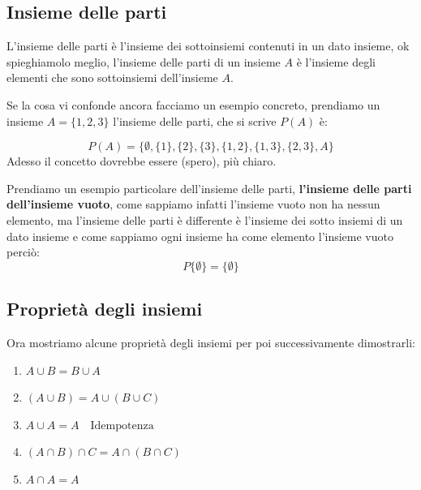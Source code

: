 \documentclass{article}
\begin{document}
\subsection{Insieme delle parti}
L'insieme delle parti è l'insieme dei sottoinsiemi contenuti in un dato insieme, ok spieghiamolo meglio, l'insieme delle parti di un insieme $A$ è l'insieme degli elementi che sono sottoinsiemi dell'insieme $A$. \par
Se la cosa vi confonde ancora facciamo un esempio concreto, prendiamo un insieme $A = \{1,2,3\}$ l'insieme delle parti, che si scrive $P(A)$ è:

\begin{equation}
        P(A) = \{\emptyset, \{1\}, \{2\}, \{3\}, \{1, 2\}, \{1, 3\}, \{2, 3\}, A \}
\end{equation}
Adesso il concetto dovrebbe essere (spero), più chiaro. \newline 

Prendiamo un esempio particolare dell'insieme delle parti, \textbf{l'insieme delle parti dell'insieme vuoto}, come sappiamo infatti l'insieme vuoto non ha nessun elemento, ma l'insieme delle parti è differente è l'insieme dei sotto insiemi di un dato insieme e come sappiamo ogni insieme ha come elemento l'insieme vuoto perciò:
\begin{equation}
        P\{\emptyset\} = \{\emptyset  \}
\end{equation}


\subsection{Proprietà degli insiemi}
Ora mostriamo alcune proprietà degli insiemi per poi successivamente dimostrarli:
\begin{enumerate}
        \item $A \cup B = B \cup A$\label{itm:prop1}	
        \item $(A \cup B) = A \cup (B \cup C)$\label{itm:prop_associativa1}
        \item $A \cup A = A \quad \mbox{Idempotenza}$\label{itm:prop3}
        \item $(A \cap B) \cap C = A \cap (B \cap C)$\label{itm:prop_associativa2} 
        \item $A \cap A = A$\label{itm:prop5}
\end{enumerate}
\end{document}
